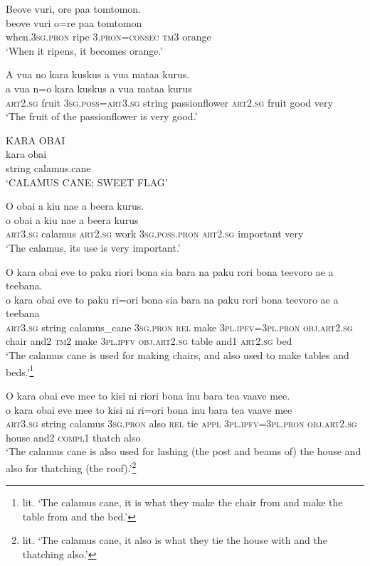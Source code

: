 \ea\label{ex:text7-42}
Beove vuri, ore paa tomtomon.\\
\gll beove	vuri	o=re	paa	tomtomon\\
     when.3\textsc{sg}.\textsc{pron}	ripe	3.\textsc{pron}=\textsc{consec}	\textsc{tm}3	orange\\
\glt `When it ripens, it becomes orange.'
\z

\ea\label{ex:text7-43}
A vua no kara kuskus a vua mataa kurus.\\
\gll a	vua	n=o	kara	kuskus	a	vua	mataa	kurus\\
     \textsc{art}2.\textsc{sg}	fruit	3\textsc{sg}.\textsc{poss}=\textsc{art}3.\textsc{sg}	string	passionflower	\textsc{art}2.\textsc{sg}	fruit	good	very\\
\glt `The fruit of the passionflower is very good.'
\z

\ea\label{ex:text7-44}
KARA OBAI\\
\gll kara	obai\\
     string	calamus.cane\\
\glt `CALAMUS CANE; SWEET FLAG'
\z

\ea\label{ex:text7-45}
O obai a kiu nae a beera kurus.\\
\gll o	obai	a	kiu	nae	a	beera	kurus\\
     \textsc{art}3.\textsc{sg}	calamus	\textsc{art}2.\textsc{sg}	work	3\textsc{sg}.\textsc{poss}.\textsc{pron}	\textsc{art}2.\textsc{sg}	important	very\\
\glt `The calamus, its use is very important.'
\z

\ea\label{ex:text7-46}
O kara obai eve to paku riori bona sia bara na paku rori bona teevoro ae a teebana.\\
\gll o	kara	obai	eve	to	paku	ri=ori	bona	sia	bara	na	paku	rori	bona	teevoro	ae	a	teebana\\
     \textsc{art}3.\textsc{sg}	string	calamus\_cane	3\textsc{sg}.\textsc{pron}	\textsc{rel}	make	3\textsc{pl}.\textsc{ipfv}=3\textsc{pl}.\textsc{pron}	\textsc{obj}.\textsc{art}2.\textsc{sg}	chair	and2	\textsc{tm}2	make	3\textsc{pl}.\textsc{ipfv}	\textsc{obj}.\textsc{art}2.\textsc{sg}	table	and1	\textsc{art}2.\textsc{sg}	bed\\
\glt `The calamus cane is used for making chairs, and also used to make tables and beds.'\footnote{lit. `The calamus cane, it is what they make the chair from and make the table from and the bed.'}
\z

\ea\label{ex:text7-47}
O kara obai eve mee to kisi ni riori bona inu bara tea vaave mee.\\
\gll o	kara	obai	eve	mee	to	kisi	ni	ri=ori	bona	inu	bara	tea	vaave	mee\\
     \textsc{art}3.\textsc{sg}	string	calamus	3\textsc{sg}.\textsc{pron}	also	\textsc{rel}	tie	\textsc{appl}	3\textsc{pl}.\textsc{ipfv}=3\textsc{pl}.\textsc{pron}	\textsc{obj}.\textsc{art}2.\textsc{sg}	house	and2	\textsc{compl}1	thatch	also\\
\glt `The calamus cane is also used for lashing (the post and beams of) the house and also for thatching (the roof).'\footnote{lit. `The calamus cane, it also is what they tie the house with and the thatching also.'}
\z

